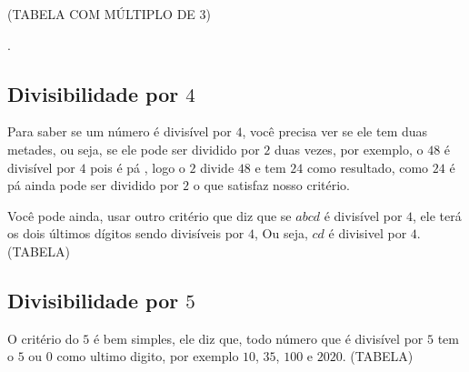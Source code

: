 (TABELA COM MÚLTIPLO DE 3)

.\subsection{Divisibilidade por $4$}
 Para saber se um número é divisível por $4$, você precisa ver se ele tem duas metades, ou seja, se ele pode ser dividido por $2$ duas vezes, por exemplo, o $48$ é divisível por $4$ pois é pá , logo o $2$ divide $48$ e tem $24$ como resultado, como $24$ é pá ainda pode ser dividido por $2$ o que satisfaz nosso critério.
 
Você pode ainda, usar outro critério que diz que se $abcd$ é divisível por $4$, ele terá os dois últimos dígitos sendo divisíveis por $4$, Ou seja, $cd$ é divisivel por $4$. 
(TABELA)
\subsection{Divisibilidade por $5$}
O critério do $5$ é bem simples, ele diz que, todo número que é divisível por $5$ tem o $5$ ou $0$ como ultimo digito, por exemplo $10$, $35$, $100$ e $2020$.
(TABELA)